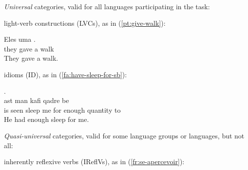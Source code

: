 \documentclass[output=paper,modfonts]{langscibook}
\begin{document}
\begin{senum}
\item \textit{Universal} categories, valid for all languages participating in the task:
\begin{senum}
\item light-verb constructions (LVCs), as in (\ref{pt:give-walk}):

\ea \label{pt:give-walk}
\settowidth {} 
\gll Eles  uma .\\
they gave a walk \\ 
\glt They gave a walk. 
\z

\item idioms (ID), as in (\ref{fa:have-sleep-for-sb}):

\ea \label{fa:have-sleep-for-sb}
\settowidth {} 
\glll .       \\
ast   man  kafi qadre be  \\
is seen sleep me for enough quantity to\\ 
\glt He had enough sleep for me. 
\z

\end{senum}
\item \textit{Quasi-universal} categories, valid for some language groups or languages, but not all:
\begin{senum}
\item inherently reflexive verbs (IReflVs), as in (\ref{fr:se-apercevoir}):


\end{senum}
\end{senum}
\end{document}
